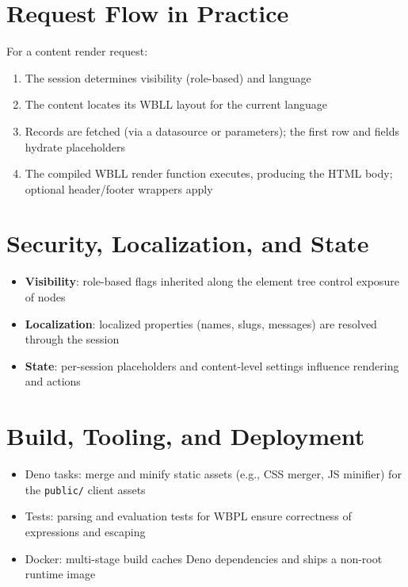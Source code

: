 \section{Request Flow in Practice}
For a content render request:
\begin{enumerate}
	\item The session determines visibility (role-based) and language
	\item The content locates its WBLL layout for the current language
	\item Records are fetched (via a datasource or parameters); the first row and fields hydrate placeholders
	\item The compiled WBLL render function executes, producing the HTML body; optional header/footer wrappers apply
\end{enumerate}

\section{Security, Localization, and State}
\begin{itemize}
	\item \textbf{Visibility}: role-based flags inherited along the element tree control exposure of nodes
	\item \textbf{Localization}: localized properties (names, slugs, messages) are resolved through the session
	\item \textbf{State}: per-session placeholders and content-level settings influence rendering and actions
\end{itemize}

\section{Build, Tooling, and Deployment}
\begin{itemize}
	\item Deno tasks: merge and minify static assets (e.g., CSS merger, JS minifier) for the \texttt{public/} client assets
	\item Tests: parsing and evaluation tests for WBPL ensure correctness of expressions and escaping
	\item Docker: multi-stage build caches Deno dependencies and ships a non-root runtime image
\end{itemize}

